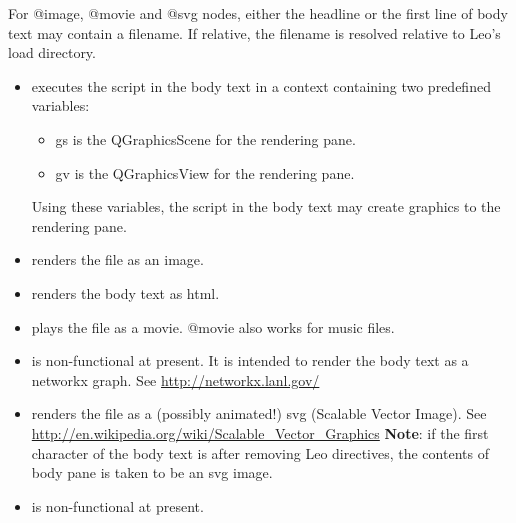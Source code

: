 \documentclass[a4paper,10pt,english]{sphinxmanual}
\begin{document}
For @image, @movie and @svg nodes, either the headline or the first line of body
text may contain a filename.  If relative, the filename is resolved relative to
Leo's load directory.
\begin{itemize}
\item {} 
 executes the script in the body text in a context containing
two predefined variables:
\begin{itemize}
\item {} 
gs is the QGraphicsScene for the rendering pane.

\item {} 
gv is the QGraphicsView for the rendering pane.

\end{itemize}

Using these variables, the script in the body text may create graphics to the
rendering pane.

\item {} 
 renders the file as an image.

\item {} 
 renders the body text as html.

\item {} 
 plays the file as a movie.  @movie also works for music files.

\item {} 
 is non-functional at present.  It is intended to
render the body text as a networkx graph.
See \href{http://networkx.lanl.gov/}{http://networkx.lanl.gov/}

\item {} 
 renders the file as a (possibly animated!) svg (Scalable Vector Image).
See \href{http://en.wikipedia.org/wiki/Scalable\_Vector\_Graphics}{http://en.wikipedia.org/wiki/Scalable\_Vector\_Graphics}
\textbf{Note}: if the first character of the body text is \code{\textless{}} after removing Leo directives,
the contents of body pane is taken to be an svg image.

\item {} 
 is non-functional at present.

\end{itemize}
\end{document}

